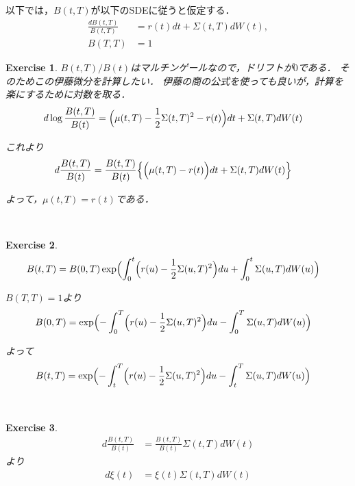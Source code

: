 \documentclass[11pt, a4paper]{jsarticle}
\newtheorem{exercise}{Exercise}[section]
\begin{document}
以下では，$B(t, T)$が以下のSDEに従うと仮定する．
\begin{align}
\frac{d B(t, T)}{B(t, T)}
& =
r(t) dt + \Sigma(t, T) dW(t), \nonumber \\
B(T, T)
& =
1 \nonumber
\end{align}

\hrulefill
\begin{exercise}
$B(t, T) / B(t)$はマルチンゲールなので，ドリフトが$\mathrm{0}$である．
そのためこの伊藤微分を計算したい．
伊藤の商の公式を使っても良いが，計算を楽にするために対数を取る．
\begin{align}
d \log \frac{B(t, T)}{B(t)}
& =
\Bigl( \mu(t, T) - \frac{1}{2} \Sigma(t, T)^2 - r(t) \Bigr) dt + \Sigma(t, T) dW(t) \nonumber
\end{align}

これより
\begin{align}
d \frac{B(t, T)}{B(t)}
& =
\frac{B(t, T)}{B(t)} \Bigl\{ \Bigl( \mu(t, T) - r(t) \Bigr) dt + \Sigma(t, T) dW(t) \Bigr\} \nonumber
\end{align}

よって，$\mu(t, T) = r(t)$である．
\end{exercise}
\hrulefill \\

\hrulefill
\begin{exercise}
\begin{align}
B(t, T)
& =
B(0, T) \exp \Bigl( \int_0^t \Bigl( r(u) - \frac{1}{2} \Sigma(u, T)^2 \Bigr) du + \int_0^t \Sigma(u, T) dW(u) \Bigr) \nonumber
\end{align}

$B(T, T) = 1$より
\begin{align}
B(0, T)
& =
\exp \Bigl( -\int_0^T \Bigl( r(u) - \frac{1}{2} \Sigma(u, T)^2 \Bigr) du - \int_0^T \Sigma(u, T) dW(u) \Bigr) \nonumber
\end{align}

よって
\begin{align}
B(t, T)
& =
\exp \Bigl( -\int_t^T \Bigl( r(u) - \frac{1}{2} \Sigma(u, T)^2 \Bigr) du - \int_t^T \Sigma(u, T) dW(u) \Bigr) \nonumber
\end{align}
\end{exercise}
\hrulefill \\

\hrulefill
\begin{exercise}
\begin{align}
d \frac{B(t, T)}{B(t)}
& =
\frac{B(t, T)}{B(t)} \Sigma(t, T) dW(t) \nonumber
\end{align}
より
\begin{align}
d \xi(t)
& =
\xi(t) \Sigma(t, T) dW(t) \nonumber
\end{align}
\end{exercise}
\hrulefill \\
\end{document}
